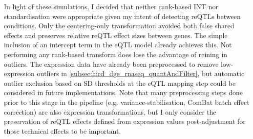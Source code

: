 In light of these simulations, I decided that neither rank-based \gls{INT} nor standardisation were appropriate given my intent of detecting \glspl{reQTL} between conditions.
Only the centering-only transformation avoided both false shared effects and preserves relative \gls{reQTL} effect sizes between genes.
The simple inclusion of an intercept term in the \gls{eQTL} model already achieves this.
Not performing any rank-based transform does lose the advantage of reining in outliers.
The expression data have already been preprocessed to remove low-expression outliers in \autoref{subsec:hird_dge_rnaseq_quantAndFilter}, 
but automatic outlier exclusion based on \gls{SD} thresholds at the \gls{eQTL} mapping step could be considered in future implementations\autocite{vosa2018UnravelingPolygenicArchitecture}.
Note that many preprocessing steps done prior to this stage in the pipeline (e.g. variance-stabilisation, ComBat batch effect correction) are also expression transformations,
but I only consider the preservation of \gls{reQTL} effects defined from expression values post-adjustment for those technical effects to be important.


